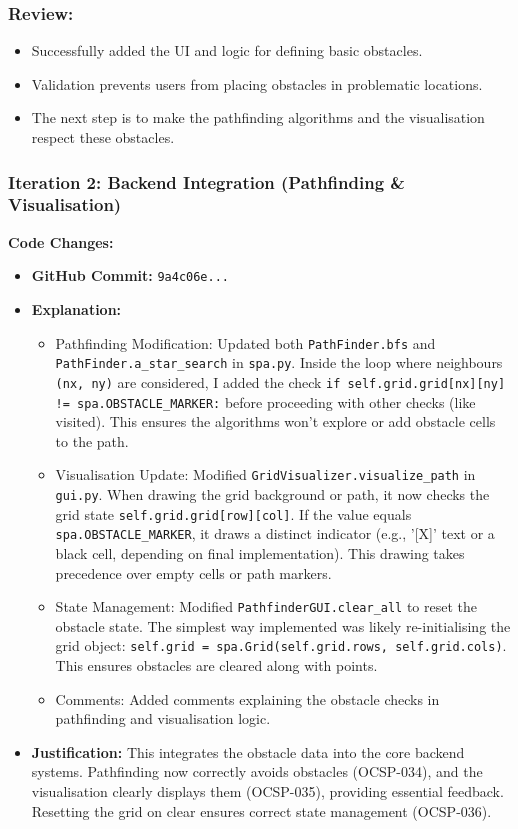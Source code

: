 \subsubsection{Review:}
\begin{itemize}
	\item Successfully added the UI and logic for defining basic obstacles.
	\item Validation prevents users from placing obstacles in problematic locations.
	\item The next step is to make the pathfinding algorithms and the visualisation respect these obstacles.
\end{itemize}

\newpage

\subsubsection{Iteration 2: Backend Integration (Pathfinding \& Visualisation)}

\textbf{Code Changes:}
\begin{itemize}
	\item \textbf{GitHub Commit:} \verb|9a4c06e...|
	\item \textbf{Explanation:}
	\begin{itemize}
		\item Pathfinding Modification: Updated both \verb|PathFinder.bfs| and \verb|PathFinder.a_star_search| in \verb|spa.py|. Inside the loop where neighbours \verb|(nx, ny)| are considered, I added the check \verb|if self.grid.grid[nx][ny] != spa.OBSTACLE_MARKER:| before proceeding with other checks (like visited). This ensures the algorithms won't explore or add obstacle cells to the path.
		\item Visualisation Update: Modified \verb|GridVisualizer.visualize_path| in \verb|gui.py|. When drawing the grid background or path, it now checks the grid state \verb|self.grid.grid[row][col]|. If the value equals \verb|spa.OBSTACLE_MARKER|, it draws a distinct indicator (e.g., '[X]' text or a black cell, depending on final implementation). This drawing takes precedence over empty cells or path markers.
		\item State Management: Modified \verb|PathfinderGUI.clear_all| to reset the obstacle state. The simplest way implemented was likely re-initialising the grid object: \verb|self.grid = spa.Grid(self.grid.rows, self.grid.cols)|. This ensures obstacles are cleared along with points.
		\item Comments: Added comments explaining the obstacle checks in pathfinding and visualisation logic.
	\end{itemize}
	\item \textbf{Justification:} This integrates the obstacle data into the core backend systems. Pathfinding now correctly avoids obstacles (OCSP-034), and the visualisation clearly displays them (OCSP-035), providing essential feedback. Resetting the grid on clear ensures correct state management (OCSP-036).
\end{itemize}


